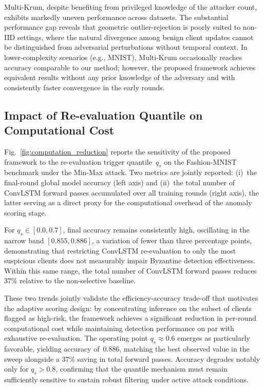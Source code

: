 \documentclass[journal]{IEEEtran}
\begin{document}
Multi-Krum, despite benefiting from privileged knowledge of the attacker count, exhibits markedly uneven performance across datasets. The substantial performance gap reveals that geometric outlier-rejection is poorly suited to non-IID settings, where the natural divergence among benign client updates cannot be distinguished from adversarial perturbations without temporal context. In lower-complexity scenarios (e.g., MNIST), Multi-Krum occasionally reaches accuracy comparable to our method; however, the proposed framework achieves equivalent results without any prior knowledge of the adversary and with consistently faster convergence in the early rounds.


\subsection{Impact of Re-evaluation Quantile on Computational Cost}

Fig.~\ref{fig:computation_reduction} reports the sensitivity of the proposed framework to the re-evaluation trigger quantile~$q_s$ on the Fashion-MNIST benchmark under the Min-Max attack. Two metrics are jointly reported: (i)~the final-round global model accuracy (left axis) and (ii)~the total number of ConvLSTM forward passes accumulated over all training rounds (right axis), the latter serving as a direct proxy for the computational overhead of the anomaly scoring stage.

For $q_s \in [0.0, 0.7]$, final accuracy remains consistently high, oscillating in the narrow band $[0.855, 0.886]$, a variation of fewer than three percentage points, demonstrating that restricting ConvLSTM re-evaluation to only the most suspicious clients does not measurably impair Byzantine detection effectiveness. Within this same range, the total number of ConvLSTM forward passes reduces 37\% relative to the non-selective baseline.

These two trends jointly validate the efficiency-accuracy trade-off that motivates the adaptive scoring design: by concentrating inference on the subset of clients flagged as high-risk, the framework achieves a significant reduction in per-round computational cost while maintaining detection performance on par with exhaustive re-evaluation. The operating point $q_s \approx 0.6$ emerges as particularly favorable, yielding accuracy of~0.886, matching the best observed value in the sweep alongside a 37\% saving in total forward passes. Accuracy degrades notably only for $q_s > 0.8$, confirming that the quantile mechanism must remain sufficiently sensitive to sustain robust filtering under active attack conditions.
\end{document}
